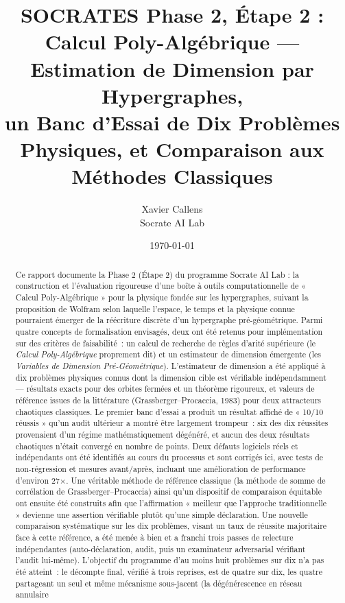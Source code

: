\documentclass[11pt,a4paper]{article}
\title{\textbf{SOCRATES Phase 2, Étape 2 :} \\
\large Calcul Poly-Algébrique --- Estimation de Dimension par Hypergraphes, \\
un Banc d'Essai de Dix Problèmes Physiques, et Comparaison aux Méthodes Classiques}
\author{Xavier Callens \\ Socrate AI Lab}
\date{\today}
\begin{document}
\maketitle

\begin{abstract}
Ce rapport documente la Phase 2 (Étape 2) du programme Socrate AI Lab : la
construction et l'évaluation rigoureuse d'une boîte à outils computationnelle
de « Calcul Poly-Algébrique » pour la physique fondée sur les hypergraphes,
suivant la proposition de Wolfram selon laquelle l'espace, le temps et la
physique connue pourraient émerger de la réécriture discrète d'un
hypergraphe pré-géométrique. Parmi quatre concepts de formalisation
envisagés, deux ont été retenus pour implémentation sur des critères de
faisabilité~: un calcul de recherche de règles d'arité supérieure (le
\emph{Calcul Poly-Algébrique} proprement dit) et un estimateur de dimension
émergente (les \emph{Variables de Dimension Pré-Géométrique}). L'estimateur
de dimension a été appliqué à dix problèmes physiques connus dont la
dimension cible est vérifiable indépendamment --- résultats exacts pour des
orbites fermées et un théorème rigoureux, et valeurs de référence issues de
la littérature (Grassberger--Procaccia, 1983) pour deux attracteurs
chaotiques classiques. Le premier banc d'essai a produit un résultat
affiché de « 10/10 réussis » qu'un audit ultérieur a montré être largement
trompeur~: six des dix réussites provenaient d'un régime mathématiquement
dégénéré, et aucun des deux résultats chaotiques n'était convergé en nombre
de points. Deux défauts logiciels réels et indépendants ont été identifiés
au cours du processus et sont corrigés ici, avec tests de non-régression et
mesures avant/après, incluant une amélioration de performance d'environ
27$\times$. Une véritable méthode de référence classique (la méthode de
somme de corrélation de Grassberger--Procaccia) ainsi qu'un dispositif de
comparaison équitable ont ensuite été construits afin que l'affirmation
« meilleur que l'approche traditionnelle » devienne une assertion
vérifiable plutôt qu'une simple déclaration. Une nouvelle comparaison
systématique sur les dix problèmes, visant un taux de réussite majoritaire
face à cette référence, a été menée à bien et a franchi trois passes de
relecture indépendantes (auto-déclaration, audit, puis un examinateur
adversarial vérifiant l'audit lui-même). L'objectif du programme d'au
moins huit problèmes sur dix n'a pas été atteint~: le décompte final,
vérifié à trois reprises, est de quatre sur dix, les quatre partageant un
seul et même mécanisme sous-jacent (la dégénérescence en réseau annulaire

\end{abstract}
\end{document}
